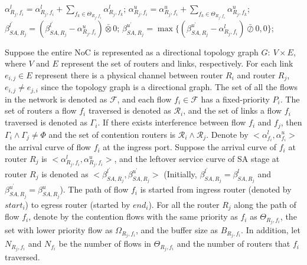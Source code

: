 \documentclass[10pt,journal]{IEEEtran}
\begin{document}
\begin{algorithm}
\begin{algorithmic}[1]
                    \STATE $\alpha^l_{R_j,f_i}=\alpha^l_{R_j,f_i}+\sum_{f_k\in\Theta_{R_j,f_i}}\alpha^l_{R_j,f_k}$;
                    \STATE $\alpha^u_{R_j,f_i}=\alpha^u_{R_j,f_i}+\sum_{f_k\in\Theta_{R_j,f_i}}\alpha^u_{R_j,f_k}$;
                \ENDIF
                \STATE $\beta^{l^\prime}_{SA,R_j}=(\beta^{l^\prime}_{SA,R_j}-\alpha^u_{R_j,f_i})\bar{\otimes}0$;
                \STATE $\beta^{u^\prime}_{SA,R_j}=\max\{(\beta^{u^\prime}_{SA,R_j}-\alpha^l_{R_j,f_i})\bar{\oslash}0,0\}$;
            \ENDIF
        \ENDFOR
    \ENDFOR
\end{algorithmic}
\end{algorithm}

Suppose the entire NoC is represented as a directional topology graph $G:\ V\times E$, where $V$ and $E$ represent the set of routers and links, respectively. For each link $e_{i,j}\in E$ represent there is a physical channel between router $R_i$ and router $R_j$, $e_{i,j}\neq e_{j,i}$ since the topology graph is a directional graph. The set of all the flows in the network is denoted as $\mathcal{F}$, and each flow $f_i\in\mathcal{F}$ has a fixed-priority $P_i$. The set of routers a flow $f_i$ traversed is denoted as $\mathcal{R}_i$, and the set of links a flow $f_i$ traversed is denoted as $\Gamma_i$. If there exists interference between flow $f_i$ and $f_j$, then $\Gamma_i\wedge\Gamma_j\neq\Phi$ and the set of contention routers is $\mathcal{R}_i\wedge\mathcal{R}_j$. Denote by $<\alpha_{f_i}^l,\alpha_{f_i}^u>$ the arrival curve of flow $f_i$ at the ingress port. Suppose the arrival curve of $f_i$ at router $R_j$ is $<\alpha_{R_j,f_i}^l,\alpha_{R_j,f_i}^u>$, and the leftover service curve of SA stage at router $R_j$ is denoted as $<\beta_{SA,R_j}^{l^\prime},\beta_{SA,R_j}^{u^\prime}>$ (Initially, $\beta_{SA,R_j}^{l^\prime}=\beta_{SA,R_j}^{l}$ and $\beta_{SA,R_j}^{u^\prime}=\beta_{SA,R_j}^{u}$). The path of flow $f_i$ is started from ingress router (denoted by $start_i$) to egress router (started by $end_i$). For all the router $R_j$ along the path of flow $f_i$, denote by the contention flows with the same priority as $f_i$ as $\Theta_{R_j,f_i}$, the set with lower priority flow as $\Omega_{R_j,f_i}$, and the buffer size as $B_{R_j,f_i}$. In addition, let $N_{R_j,f_i}$ and $N_{f_i}$ be the number of flows in $\Theta_{R_j,f_i}$ and the number of routers that $f_i$ traversed.
\end{document}
